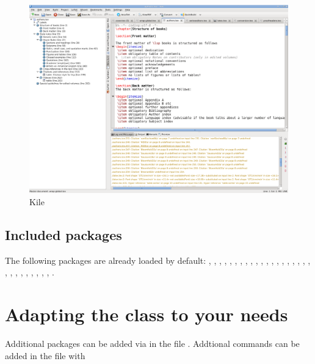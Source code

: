 \begin{figure}
\includegraphics[width=\textwidth]{kile.png}
\caption{Kile}
\label{fig:latex:kile} 
\end{figure}

  
\subsection{Included packages}
The following packages are already loaded by default: 
, 
, 
, 
, 
, 
, 
, 
, 
, 
, 
, 
, 
, 
, 
, 
, 
, 
, 
, 
, 
, 
, 
, 
, 
, 
, 
, 
, 
, 
. 

\section{Adapting the class to your needs}

Additional packages can be added via  in the file .
Addtional commands can be added in the file  with 

